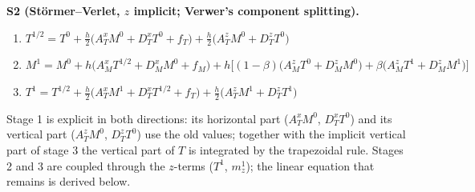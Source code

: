 \documentclass[11pt,a4paper]{article}
\begin{document}
\medskip\noindent\textbf{S2 (Störmer--Verlet, $z$ implicit; Verwer's component splitting).}
\begin{enumerate}
\item $T^{1/2}=T^0+\tfrac h2\big(A_T^xM^0+D_T^xT^0+f_T\big)+\tfrac h2\big(A_T^zM^0+D_T^zT^0\big)$
\item $M^1=M^0+h\big(A_M^xT^{1/2}+D_M^xM^0+f_M\big)+h\big[(1-\beta)\big(A_M^zT^0+D_M^zM^0\big)+\beta\big(A_M^zT^1+D_M^zM^1\big)\big]$
\item $T^1=T^{1/2}+\tfrac h2\big(A_T^xM^1+D_T^xT^{1/2}+f_T\big)+\tfrac h2\big(A_T^zM^1+D_T^zT^1\big)$
\end{enumerate}
Stage 1 is explicit in both directions: its horizontal part ($A_T^xM^0$, $D_T^xT^0$) and its vertical part ($A_T^zM^0$, $D_T^zT^0$) use the
old values; together with the implicit vertical part of stage 3 the vertical part of $T$ is integrated by the trapezoidal rule. Stages 2 and 3 are coupled through the $z$-terms
($T^1$, $m_z^1$); the linear equation that remains is derived below.
\end{document}
